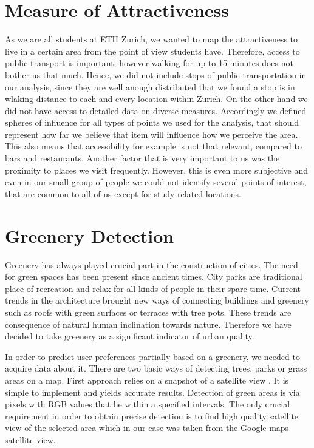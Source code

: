 \documentclass[letterpaper]{article}
\begin{document}
\section{Measure of Attractiveness}\label{sec:attractiveness}
As we are all students at ETH Zurich, we wanted to map the attractiveness to live in a certain area from the point of view students have.
Therefore, access to public transport is important, however walking for up to 15 minutes does not bother us that much. Hence, we did not
include stops of public transportation in our analysis, since they are well anough distributed that we found a stop is in wlaking distance
to each and every location within Zurich.
On the other hand we did not have access to detailed data on diverse measures. Accordingly we defined spheres of influence for all types
of points we used for the analysis, that should represent how far we believe that item will influence how we perceive the area.
This also means that accessibility for example is not that relevant, compared to bars and restaurants. Another factor that is
very important to us was the proximity to places we visit frequently. However, this is even more subjective and even in our
small group of people we could not identify several points of interest, that are common to all of us except for study related locations.

\section{Greenery Detection}\label{sec:greenery}
\indent Greenery has always played crucial part in the construction of cities. The need for green spaces has been present since ancient times.
City parks are traditional place of recreation and relax for all kinds of people in their spare time. Current trends in the architecture brought new ways of
connecting buildings and greenery such as roofs with green surfaces or terraces with tree pots. These trends are consequence of natural
human inclination towards nature. Therefore we have decided to take greenery as a significant indicator of urban quality.

\indent In order to predict user preferences partially based on a greenery, we needed to acquire data about it. There are two basic ways of detecting trees,
parks or grass areas on a map. First approach relies on a snapshot of a satellite view \cite{smartCities}. It is simple to implement and yields accurate results.
Detection of green areas is via pixels with RGB values that lie within a specified intervals. The only crucial requirement in order to obtain precise detection
is to find high quality satellite view of the selected area which in our case was taken from the Google maps satellite view.
\end{document}
